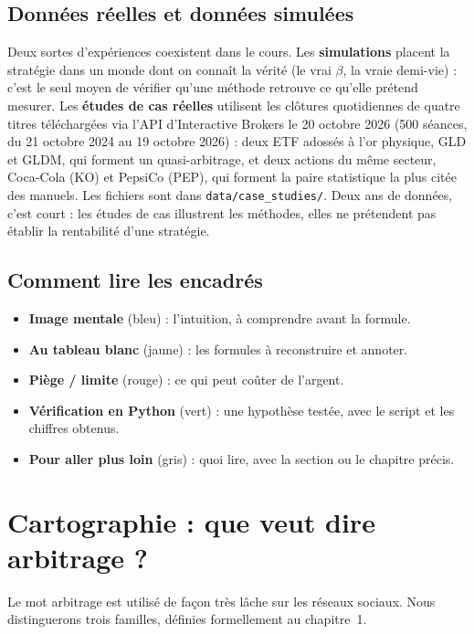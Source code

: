 \subsection{Données réelles et données simulées}
Deux sortes d'expériences coexistent dans le cours. Les \textbf{simulations} placent la stratégie dans un monde dont on connaît la vérité (le vrai $\beta$, la vraie demi-vie) : c'est le seul moyen de vérifier qu'une méthode retrouve ce qu'elle prétend mesurer. Les \textbf{études de cas réelles} utilisent les clôtures quotidiennes de quatre titres téléchargées via l'API d'Interactive Brokers le 20 octobre 2026 (500 séances, du 21 octobre 2024 au 19 octobre 2026) : deux ETF adossés à l'or physique, GLD et GLDM, qui forment un quasi-arbitrage, et deux actions du même secteur, Coca-Cola (KO) et PepsiCo (PEP), qui forment la paire statistique la plus citée des manuels. Les fichiers sont dans \texttt{data/case\_studies/}. Deux ans de données, c'est court : les études de cas illustrent les méthodes, elles ne prétendent pas établir la rentabilité d'une stratégie.

\subsection{Comment lire les encadrés}
\begin{itemize}
\item \textbf{Image mentale} (bleu) : l'intuition, à comprendre avant la formule.
\item \textbf{Au tableau blanc} (jaune) : les formules à reconstruire et annoter.
\item \textbf{Piège / limite} (rouge) : ce qui peut coûter de l'argent.
\item \textbf{Vérification en Python} (vert) : une hypothèse testée, avec le script et les chiffres obtenus.
\item \textbf{Pour aller plus loin} (gris) : quoi lire, avec la section ou le chapitre précis.
\end{itemize}

\section{Cartographie : que veut dire \og arbitrage\fg{} ?}\label{c0:carto}

Le mot \og arbitrage\fg{} est utilisé de façon très lâche sur les réseaux sociaux. Nous distinguerons trois familles, définies formellement au chapitre~1.

